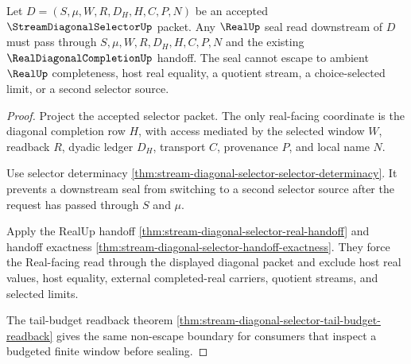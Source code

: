 \begin{theorem}
\label{thm:stream-diagonal-selector-real-seal-nonescape}
Let $D=(S,\mu,W,R,D_H,H,C,P,N)$ be an accepted $\StreamDiagonalSelectorUp$ packet. Any $\RealUp$ seal read downstream of $D$ must pass through $S,\mu,W,R,D_H,H,C,P,N$ and the existing $\RealDiagonalCompletionUp$ handoff. The seal cannot escape to ambient $\RealUp$ completeness, host real equality, a quotient stream, a choice-selected limit, or a second selector source.
\end{theorem}
\begin{proof}
Project the accepted selector packet. The only real-facing coordinate is the diagonal completion row $H$, with access mediated by the selected window $W$, readback $R$, dyadic ledger $D_H$, transport $C$, provenance $P$, and local name $N$.

Use selector determinacy \autoref{thm:stream-diagonal-selector-selector-determinacy}. It prevents a downstream seal from switching to a second selector source after the request has passed through $S$ and $\mu$.

Apply the RealUp handoff \autoref{thm:stream-diagonal-selector-real-handoff} and handoff exactness \autoref{thm:stream-diagonal-selector-handoff-exactness}. They force the Real-facing read through the displayed diagonal packet and exclude host real values, host equality, external completed-real carriers, quotient streams, and selected limits.

The tail-budget readback theorem \autoref{thm:stream-diagonal-selector-tail-budget-readback} gives the same non-escape boundary for consumers that inspect a budgeted finite window before sealing.
\end{proof}

